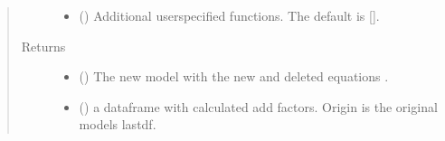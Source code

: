 \documentclass[letterpaper,10pt,english]{sphinxmanual}
\begin{document}
\begin{fulllineitems}
\begin{fulllineitems}
\begin{quote}
\begin{description}
\begin{itemize}
\item {} 
\sphinxAtStartPar
{} (\sphinxstyleliteralemphasis{\sphinxupquote{, }}) \textendash{} Additional userspecified functions. The default is {[}{]}.

\end{itemize}

\item[{Returns}] \leavevmode
\sphinxAtStartPar
\begin{itemize}
\item {} 
\sphinxAtStartPar
{} () \textendash{} The new  model with the new and deleted equations .

\item {} 
\sphinxAtStartPar
{} () \textendash{} a dataframe with calculated add factors. Origin is the original models lastdf.

\end{itemize}


\end{description}\end{quote}

\end{fulllineitems}


\end{fulllineitems}

\end{document}
